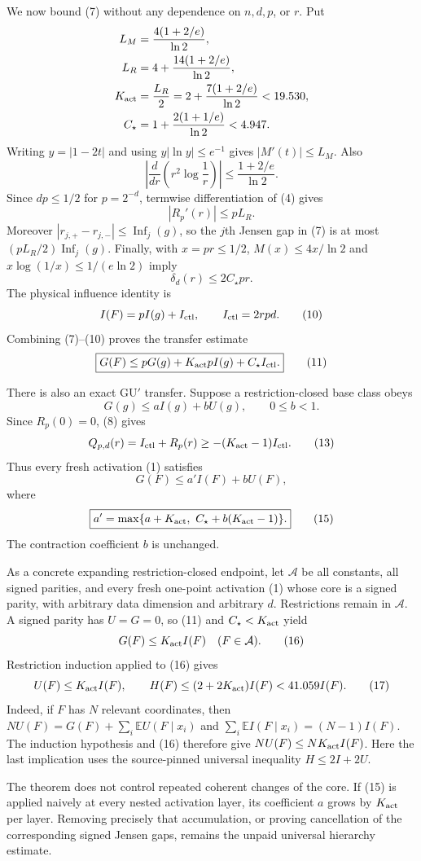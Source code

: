 We now bound (7) without any dependence on $n,d,p$, or $r$.  Put
\begin{align*}
 L_M&=\frac{4(1+2/e)}{\ln2},\\
 L_R&=4+\frac{14(1+2/e)}{\ln2},\\
 K_{\rm act}&=\frac{L_R}{2}
 =2+\frac{7(1+2/e)}{\ln2}<19.530,\\
 C_\star&=1+\frac{2(1+1/e)}{\ln2}<4.947.
\end{align*}
Writing $y=|1-2t|$ and using $y|\ln y|\leq e^{-1}$ gives
$|M'(t)|\leq L_M$.  Also
\[
 \left|\frac d{dr}\left(r^2\log\frac1r\right)\right|
 \leq\frac{1+2/e}{\ln2}.
\]
Since $dp\leq1/2$ for $p=2^{-d}$, termwise differentiation of (4) gives
\[
 |R_p'(r)|\leq pL_R.                                         \tag{8}
\]
Moreover $|r_{j,+}-r_{j,-}|\leq\operatorname{Inf}_j(g)$, so
the $j$th Jensen gap in (7) is at most
$(pL_R/2)\operatorname{Inf}_j(g)$.  Finally, with $x=pr\leq1/2$,
$M(x)\leq4x/\ln2$ and $x\log(1/x)\leq1/(e\ln2)$ imply
\[
 \delta_d(r)\leq2C_\star pr.                                \tag{9}
\]
The physical influence identity is
\[
 I(F)=pI(g)+I_{\rm ctl},\qquad I_{\rm ctl}=2rpd.             \tag{10}
\]
Combining (7)--(10) proves the transfer estimate
\[
 \boxed{G(F)\leq pG(g)+K_{\rm act}pI(g)+C_\star I_{\rm ctl}.} \tag{11}
\]

There is also an exact GU$'$ transfer.  Suppose a restriction-closed base
class obeys
\[
 G(g)\leq aI(g)+bU(g),\qquad 0\leq b<1.                     \tag{12}
\]
Since $R_p(0)=0$, (8) gives
\[
 Q_{p,d}(r)=I_{\rm ctl}+R_p(r)
 \geq-(K_{\rm act}-1)I_{\rm ctl}.                           \tag{13}
\]
Thus every fresh activation (1) satisfies
\[
 G(F)\leq a'I(F)+bU(F),                                     \tag{14}
\]
where
\[
 \boxed{a'=\max\{a+K_{\rm act},\ C_\star+b(K_{\rm act}-1)\}.} \tag{15}
\]
The contraction coefficient $b$ is unchanged.

As a concrete expanding restriction-closed endpoint, let $\mathcal A$ be
all constants, all signed parities, and every fresh one-point activation
(1) whose core is a signed parity, with arbitrary data dimension and
arbitrary $d$.  Restrictions remain in $\mathcal A$.  A signed parity has
$U=G=0$, so (11) and $C_\star<K_{\rm act}$ yield
\[
 G(F)\leq K_{\rm act}I(F)\quad(F\in\mathcal A).             \tag{16}
\]
Restriction induction applied to (16) gives
\[
 U(F)\leq K_{\rm act}I(F),\qquad
 H(F)\leq(2+2K_{\rm act})I(F)<41.059I(F).                  \tag{17}
\]
Indeed, if $F$ has $N$ relevant coordinates, then
$NU(F)=G(F)+\sum_i\mathbb E U(F\mid x_i)$ and
$\sum_i\mathbb E I(F\mid x_i)=(N-1)I(F)$.  The induction hypothesis and
(16) therefore give $NU(F)\leq NK_{\rm act}I(F)$.
Here the last implication uses the source-pinned universal inequality
$H\leq2I+2U$.

The theorem does not control repeated coherent changes of the core.  If
(15) is applied naively at every nested activation layer, its coefficient
$a$ grows by $K_{\rm act}$ per layer.  Removing precisely that accumulation,
or proving cancellation of the corresponding signed Jensen gaps, remains
the unpaid universal hierarchy estimate.
